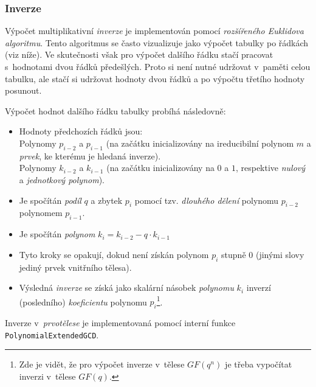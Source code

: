 \documentclass[thesis=M,czech,hidelinks]{FITthesis}[2012/06/26]
\newcommand{\0}{{\textcolor[gray]{0.100}{0}}}
\begin{document}
\subsubsection{Inverze}
Výpočet multiplikativní \emph{inverze} je implementován pomocí \emph{rozšířeného
Euklidova algoritmu}. Tento algoritmus se často vizualizuje jako výpočet tabulky
po řádkách (viz níže). Ve skutečnosti však pro výpočet dalšího řádku stačí
pracovat s~hodnotami dvou řádků předešlých. Proto si není nutné udržovat
v~paměti celou tabulku, ale stačí si udržovat hodnoty dvou řádků a po výpočtu
třetího hodnoty posunout.

Výpočet hodnot dalšího řádku tabulky probíhá následovně:
\begin{itemize}
    \item Hodnoty předchozích řádků jsou:\\
        \hspace*{0.6cm}Polynomy $p_{i-2}$ a $p_{i-1}$ (na začátku inicializovány na
            ireducibilní polynom $m$ a \emph{prvek}, ke kterému je hledaná
            inverze). \\
        \hspace*{0.6cm}Polynomy $k_{i-2}$ a $k_{i-1}$ (na začátku inicializovány
            na $0$ a $1$, respektive \emph{nulový} a \emph{jednotkový
            polynom}).
    \item Je spočítán \emph{podíl} $q$ a zbytek $p_i$ pomocí tzv. \emph{dlouhého
        dělení} polynomu $p_{i-2}$ polynomem $p_{i-1}$.
    \item Je spočítán \emph{polynom} $k_i = k_{i-2} - q \cdot k_{i-1} $

    \item Tyto kroky se opakují, dokud není získán polynom $p_i$ stupně $0$
        (jinými slovy jediný prvek vnitřního tělesa).

    \item Výsledná \emph{inverze} se získá jako skalární násobek \emph{polynomu}
        $k_i$ inverzí (posledního) \emph{koeficientu} polynomu $p_i$\footnote{
Zde je vidět, že pro výpočet inverze v~tělese $GF(q^n)$ je třeba vypočítat
inverzi v~tělese $GF(q)$.
}.
\end{itemize}

Inverze v~\emph{prvotělese} je implementovaná pomocí interní funkce
\texttt{PolynomialExtendedGCD}.
\end{document}
